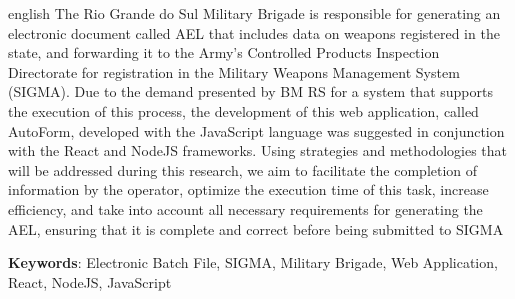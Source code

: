 \begin{resumo}[Abstract]
 \begin{otherlanguage*}{english}
  The Rio Grande do Sul Military Brigade is responsible for generating an electronic document called AEL that includes data on weapons registered in the state, and forwarding it to the Army's Controlled Products Inspection Directorate for registration in the Military Weapons Management System (SIGMA). Due to the demand presented
by BM RS for a system that supports the execution of this process, the development of this web application, called AutoForm, developed with the JavaScript language was suggested
in conjunction with the React and NodeJS frameworks. Using strategies and methodologies
that will be addressed during this research, we aim to facilitate the completion of information by the
operator, optimize the execution time of this task, increase efficiency, and take into account all
necessary requirements for generating the AEL, ensuring that it is complete and correct before
being submitted to SIGMA

   \vspace{\onelineskip}
 
   \noindent 
   \textbf{Keywords}: Electronic Batch File, SIGMA, Military Brigade, Web Application, React, NodeJS, JavaScript%
 \end{otherlanguage*}
\end{resumo}